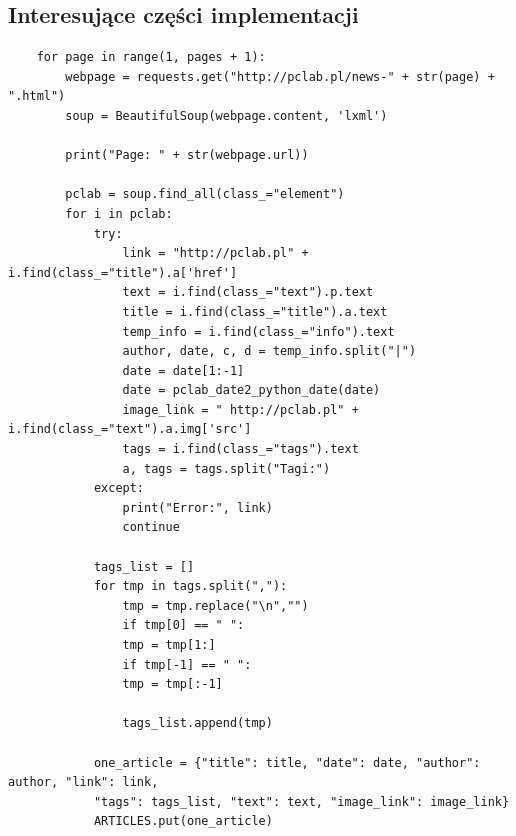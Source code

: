 \documentclass[12pt, titlepage]{article}
\begin{document}
	\subsection{Interesujące części implementacji}
	\begin{lstlisting}
	for page in range(1, pages + 1):
		webpage = requests.get("http://pclab.pl/news-" + str(page) + ".html")
		soup = BeautifulSoup(webpage.content, 'lxml')
		
		print("Page: " + str(webpage.url))
		
		pclab = soup.find_all(class_="element")
		for i in pclab:
			try:
				link = "http://pclab.pl" + i.find(class_="title").a['href']
				text = i.find(class_="text").p.text
				title = i.find(class_="title").a.text
				temp_info = i.find(class_="info").text
				author, date, c, d = temp_info.split("|")
				date = date[1:-1]
				date = pclab_date2_python_date(date)
				image_link = " http://pclab.pl" + i.find(class_="text").a.img['src']
				tags = i.find(class_="tags").text
				a, tags = tags.split("Tagi:")
			except:
				print("Error:", link)
				continue
			
			tags_list = []
			for tmp in tags.split(","):
				tmp = tmp.replace("\n","")
				if tmp[0] == " ":
				tmp = tmp[1:]
				if tmp[-1] == " ":
				tmp = tmp[:-1]
			
				tags_list.append(tmp)
			
			one_article = {"title": title, "date": date, "author": author, "link": link,
			"tags": tags_list, "text": text, "image_link": image_link}
			ARTICLES.put(one_article)
	\end{lstlisting}
	
\end{document}
